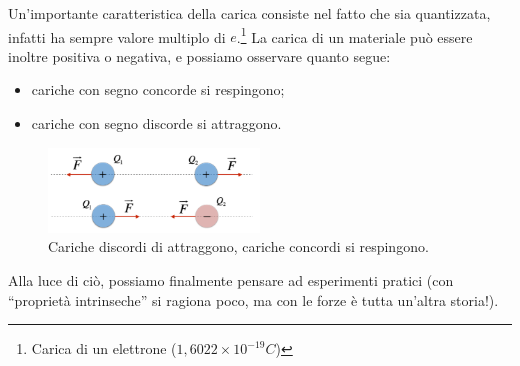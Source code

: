 \documentclass[a4paper,12pt,titlepage,openany]{book}
\theoremstyle{mydef}
\begin{document}
            Un'importante caratteristica della carica consiste nel fatto che sia quantizzata, infatti ha sempre valore
            multiplo di $e$.\footnote{Carica di un elettrone ($1,6022 \times 10^{-19}C$)}
            La carica di un materiale può essere inoltre positiva o negativa, e possiamo osservare quanto segue:
            \begin{itemize}
                \item cariche con segno concorde si respingono;
                \item cariche con segno discorde si attraggono.
            \end{itemize}
            \begin{figure}[htp]
                \centering
                \includegraphics[width=0.5\textwidth]{forza_coulomb}
                \captionsetup{width=0.6\textwidth, justification=raggedright}
                \caption[Attrazione/repulsione tra due cariche]{Cariche discordi di attraggono, cariche concordi si respingono.}
            \end{figure}
            Alla luce di ciò, possiamo finalmente pensare ad esperimenti pratici (con ``proprietà intrinseche'' si
            ragiona poco, ma con le forze è tutta un'altra storia!).
        
\end{document}
